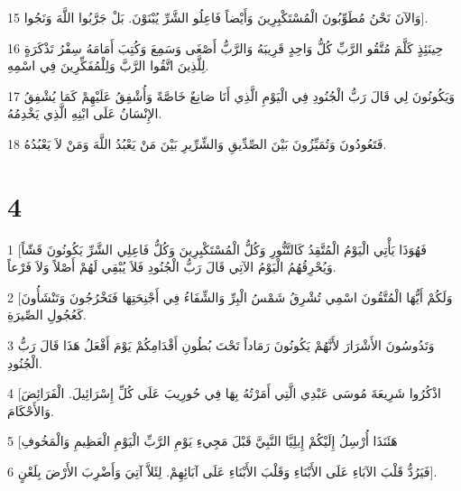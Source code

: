 \par 15 وَالآنَ نَحْنُ مُطَوِّبُونَ الْمُسْتَكْبِرِينَ وَأَيْضاً فَاعِلُو الشَّرِّ يُبْنَوْنَ. بَلْ جَرَّبُوا اللَّهَ وَنَجُوا].
\par 16 حِينَئِذٍ كَلَّمَ مُتَّقُو الرَّبِّ كُلُّ وَاحِدٍ قَرِيبَهُ وَالرَّبُّ أَصْغَى وَسَمِعَ وَكُتِبَ أَمَامَهُ سِفْرُ تَذْكَرَةٍ لِلَّذِينَ اتَّقُوا الرَّبَّ وَلِلْمُفَكِّرِينَ فِي اسْمِهِ.
\par 17 وَيَكُونُونَ لِي قَالَ رَبُّ الْجُنُودِ فِي الْيَوْمِ الَّذِي أَنَا صَانِعٌ خَاصَّةً وَأُشْفِقُ عَلَيْهِمْ كَمَا يُشْفِقُ الإِنْسَانُ عَلَى ابْنِهِ الَّذِي يَخْدِمُهُ.
\par 18 فَتَعُودُونَ وَتُمَيِّزُونَ بَيْنَ الصِّدِّيقِ وَالشِّرِّيرِ بَيْنَ مَنْ يَعْبُدُ اللَّهَ وَمَنْ لاَ يَعْبُدُهُ.

\chapter{4}

\par 1 [فَهُوَذَا يَأْتِي الْيَوْمُ الْمُتَّقِدُ كَالتَّنُّورِ وَكُلُّ الْمُسْتَكْبِرِينَ وَكُلُّ فَاعِلِي الشَّرِّ يَكُونُونَ قَشّاً وَيُحْرِقُهُمُ الْيَوْمُ الآتِي قَالَ رَبُّ الْجُنُودِ فَلاَ يُبْقِي لَهُمْ أَصْلاً وَلاَ فَرْعاً.
\par 2 [وَلَكُمْ أَيُّهَا الْمُتَّقُونَ اسْمِي تُشْرِقُ شَمْسُ الْبِرِّ وَالشِّفَاءُ فِي أَجْنِحَتِهَا فَتَخْرُجُونَ وَتَنْشَأُونَ كَعُجُولِ الصِّيرَةِ.
\par 3 وَتَدُوسُونَ الأَشْرَارَ لأَنَّهُمْ يَكُونُونَ رَمَاداً تَحْتَ بُطُونِ أَقْدَامِكُمْ يَوْمَ أَفْعَلُ هَذَا قَالَ رَبُّ الْجُنُودِ.
\par 4 [اذْكُرُوا شَرِيعَةَ مُوسَى عَبْدِي الَّتِي أَمَرْتُهُ بِهَا فِي حُورِيبَ عَلَى كُلِّ إِسْرَائِيلَ. الْفَرَائِضَ وَالأَحْكَامَ.
\par 5 [هَئَنَذَا أُرْسِلُ إِلَيْكُمْ إِيلِيَّا النَّبِيَّ قَبْلَ مَجِيءِ يَوْمِ الرَّبِّ الْيَوْمِ الْعَظِيمِ وَالْمَخُوفِ
\par 6 فَيَرُدُّ قَلْبَ الآبَاءِ عَلَى الأَبْنَاءِ وَقَلْبَ الأَبْنَاءِ عَلَى آبَائِهِمْ. لِئَلاَّ آتِيَ وَأَضْرِبَ الأَرْضَ بِلَعْنٍ].

